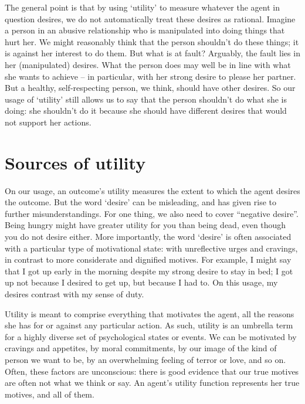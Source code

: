 The general point is that by using `utility' to measure whatever the
agent in question desires, we do not automatically treat these desires
as rational. Imagine a person in an abusive relationship who is
manipulated into doing things that hurt her. We might reasonably think
that the person shouldn't do these things; it is against her interest
to do them. But what is at fault?  Arguably, the fault lies in her
(manipulated) desires. What the person does may well be in line with
what she wants to achieve -- in particular, with her strong desire to
please her partner. But a healthy, self-respecting person, we think,
should have other desires. So our usage of `utility' still allows us
to say that the person shouldn't do what she is doing: she shouldn't
do it because she should have different desires that would not support
her actions.

\section{Sources of utility}\label{sec:sources-utility}

On our usage, an outcome's utility measures the extent to which the
agent desires the outcome. But the word `desire' can be misleading,
and has given rise to further misunderstandings. For one thing, we
also need to cover ``negative desire''. Being hungry might have
greater utility for you than being dead, even though you do not desire
either. More importantly, the word `desire' is often associated with a
particular type of motivational state: with unreflective urges and
cravings, in contrast to more considerate and dignified motives.  For
example, I might say that I got up early in the morning despite my
strong desire to stay in bed; I got up not because I desired to get
up, but because I had to. On this usage, my desires contrast with my
sense of duty.

Utility is meant to comprise everything that motivates the agent, all
the reasons she has for or against any particular action. As such,
utility is an umbrella term for a highly diverse set of psychological
states or events. We can be motivated by cravings and appetites, by
moral commitments, by our image of the kind of person we want to be,
by an overwhelming feeling of terror or love, and so on. Often, these
factors are unconscious: there is good evidence that our true motives
are often not what we think or say. An agent's utility function
represents her true motives, and all of them.



